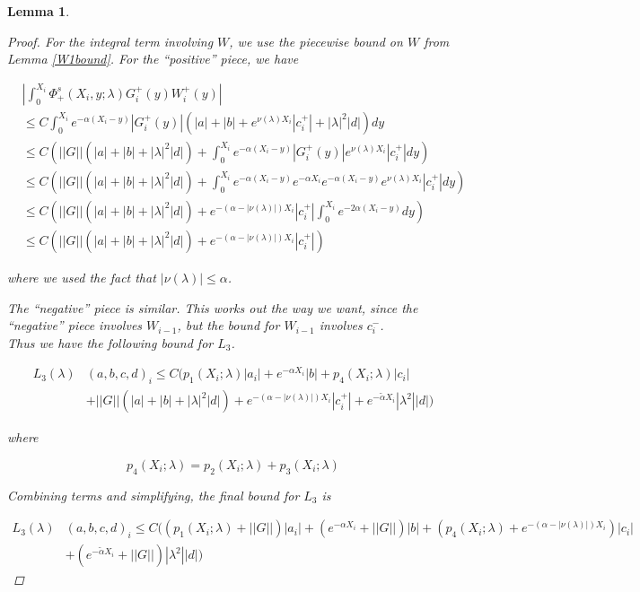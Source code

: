\documentclass[12pt]{article}
\newtheorem{lemma}{Lemma}
\begin{document}
\begin{lemma}
\begin{proof}
For the integral term involving $W$, we use the piecewise bound on $W$ from Lemma \ref{W1bound}. For the ``positive'' piece, we have

\begin{align*}
&\left| \int_0^{X_i} \Phi^s_+(X_i, y; \lambda) G_i^+(y) W_i^+(y) \right| \\
&\leq C \int_0^{X_i} e^{-\alpha(X_i - y)}|G_i^+(y)|(|a| + |b| + e^{\nu(\lambda)X_i}|c_i^+| + |\lambda|^2 |d| ) dy \\
&\leq C \left( ||G||(|a| + |b| + |\lambda|^2 |d|) + \int_0^{X_i} e^{-\alpha(X_i - y)}|G_i^+(y)|e^{\nu(\lambda)X_i}|c_i^+| dy \right) \\
&\leq C \left( ||G||(|a| + |b| + |\lambda|^2 |d|) + \int_0^{X_i} e^{-\alpha(X_i - y)}e^{-\alpha X_i} e^{-\alpha(X_i - y)} e^{\nu(\lambda)X_i}|c_i^+| dy \right)\\
&\leq C \left( ||G||(|a| + |b| + |\lambda|^2 |d|) + e^{-(\alpha - |\nu(\lambda)|)X_i} |c_i^+| \int_0^{X_i} e^{-2\alpha(X_i - y)} dy \right) \\
&\leq C \left( ||G||(|a| + |b| + |\lambda|^2 |d|) + e^{-(\alpha - |\nu(\lambda)|)X_i} |c_i^+| \right)
\end{align*}

where we used the fact that $|\nu(\lambda)| \leq \alpha$.  

The ``negative'' piece is similar. This works out the way we want, since the ``negative'' piece involves $W_{i-1}$, but the bound for $W_{i-1}$ involves $c_i^-$.\\

Thus we have the following bound for $L_3$.

\begin{align*}
L_3(\lambda)&(a, b, c, d)_i \leq C ( p_1(X_i; \lambda)|a_i|
+ e^{-\alpha X_i}|b| + p_4(X_i; \lambda)|c_i| \\
&+ ||G||(|a| + |b| + |\lambda|^2 |d|) + e^{-(\alpha - |\nu(\lambda)|)X_i} |c_i^+| + e^{-\tilde{\alpha} X_i} |\lambda^2| |d| )
\end{align*}

where

\[
p_4(X_i; \lambda) = p_2(X_i; \lambda) + p_3(X_i; \lambda)
\]

Combining terms and simplifying, the final bound for $L_3$ is

\begin{align*}
L_3(\lambda)&(a, b, c, d)_i \leq C \Big( (p_1(X_i; \lambda) + ||G|| )|a_i|
+ (e^{-\alpha X_i} + ||G||)|b| + ( p_4(X_i; \lambda) + e^{-(\alpha - |\nu(\lambda)|)X_i} )|c_i| \\
&+ (e^{-\tilde{\alpha} X_i} + ||G||) |\lambda^2| |d| \Big)
\end{align*}


\end{proof}
\end{lemma}
\end{document}
